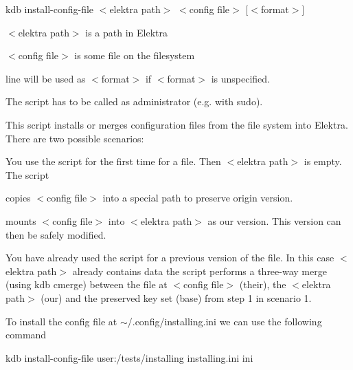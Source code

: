 {\ttfamily kdb install-\/config-\/file $<$elektra path$>$ $<$config file$>$ \mbox{[}$<$format$>$\mbox{]}}


\begin{DoxyItemize}
\item {\ttfamily $<$elektra path$>$} is a path in Elektra
\item {\ttfamily $<$config file$>$} is some file on the filesystem
\end{DoxyItemize}

{\ttfamily line} will be used as {\ttfamily $<$format$>$} if {\ttfamily $<$format$>$} is unspecified.

The script has to be called as administrator (e.\+g. with {\ttfamily sudo}).

This script installs or merges configuration files from the file system into Elektra. There are two possible scenarios\+:


\begin{DoxyEnumerate}
\item You use the script for the first time for a file. Then {\ttfamily $<$elektra path$>$} is empty. The script
\begin{DoxyEnumerate}
\item copies {\ttfamily $<$config file$>$} into a special path to preserve origin version.
\item mounts {\ttfamily $<$config file$>$} into {\ttfamily $<$elektra path$>$} as our version. This version can then be safely modified.
\end{DoxyEnumerate}
\item You have already used the script for a previous version of the file. In this case {\ttfamily $<$elektra path$>$} already contains data the script performs a three-\/way merge (using {\ttfamily kdb cmerge}) between the file at {\ttfamily $<$config file$>$} (their), the {\ttfamily $<$elektra path$>$} (our) and the preserved key set (base) from step 1 in scenario 1.
\end{DoxyEnumerate}

To install the config file at {\ttfamily $\sim$/.config/installing.\+ini} we can use the following command

{\ttfamily kdb install-\/config-\/file user\+:/tests/installing installing.\+ini ini} 
